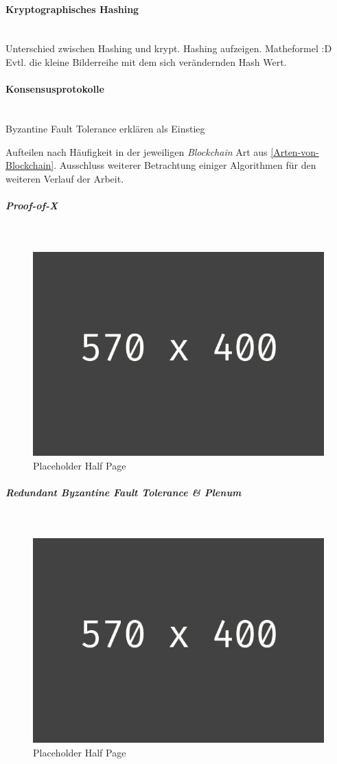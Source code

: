 \paragraph{Kryptographisches Hashing}$~~$\\
Unterschied zwischen Hashing und krypt. Hashing aufzeigen. Matheformel :D
Evtl. die kleine Bilderreihe mit dem sich verändernden Hash Wert.
\citep{Menezes1997}
\citep{Diffie1976}

\paragraph{Konsensusprotokolle}$~~$\\
Byzantine Fault Tolerance erklären als Einstieg

Aufteilen nach Häufigkeit in der jeweiligen \textit{Blockchain} Art aus \ref{Arten-von-Blockchain}.
Ausschluss weiterer Betrachtung einiger Algorithmen für den weiteren Verlauf der Arbeit.


\subparagraph{Proof-of-X}$~~$\\
\begin{figure}[h!]
	\centering
	\includegraphics[width=1.0\linewidth]{pictures/placeholder_half_page}
	\caption[Placeholder Half Page]{Placeholder Half Page}
	\label{fig:placeholder_half_page}
\end{figure}

\subparagraph{Redundant Byzantine Fault Tolerance \& Plenum}$~~$\\
\begin{figure}[h!]
	\centering
	\includegraphics[width=1.0\linewidth]{pictures/placeholder_half_page}
	\caption[Placeholder Half Page]{Placeholder Half Page}
	\label{fig:placeholder_half_page}
\end{figure}
